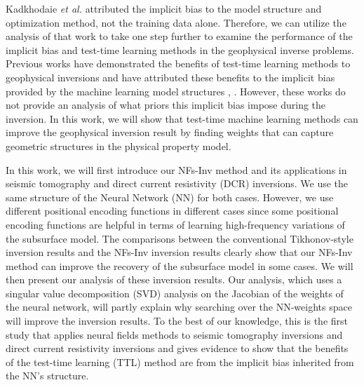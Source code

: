 \documentclass[lettersize,journal]{IEEEtran}
\begin{document}
Kadkhodaie \textit{et al.} \cite{Zahra} attributed the implicit bias to the model structure and optimization method, not the training data alone. Therefore, we can utilize the analysis of that work to take one step further to examine the performance of the implicit bias and test-time learning methods in the geophysical inverse problems. Previous works have demonstrated the benefits of test-time learning methods to geophysical inversions and have attributed these benefits to the implicit bias provided by the machine learning model structures \cite{ref18}, \cite{27}. However, these works do not provide an analysis of what priors this implicit bias impose during the inversion. In this work, we will show that test-time machine learning methods can improve the geophysical inversion result by finding weights that can capture geometric structures in the physical property model. 

In this work, we will first introduce our NFs-Inv method and its applications in seismic tomography and direct current resistivity (DCR) inversions. We use the same structure of the Neural Network (NN) for both cases. However, we use different positional encoding functions in different cases since some positional encoding functions are helpful in terms of learning high-frequency variations of the subsurface model. The comparisons between the conventional Tikhonov-style inversion results and the NFs-Inv inversion results clearly show that our NFs-Inv method can improve the recovery of the subsurface model in some cases. We will then present our analysis of these inversion results. Our analysis, which uses a singular value decomposition (SVD) analysis on the Jacobian of the weights of the neural network, will partly explain why searching over the NN-weights space will improve the inversion results. To the best of our knowledge, this is the first study that applies neural fields methods to seismic tomography inversions and direct current resistivity inversions and gives evidence to show that the benefits of the test-time learning (TTL) method are from the implicit bias inherited from the NN's structure.
\end{document}
